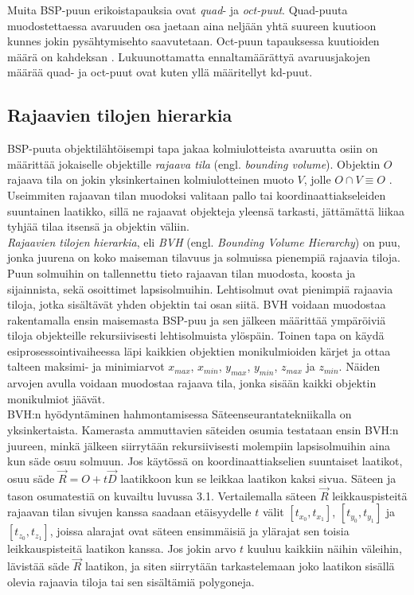 \documentclass[a4paper, 12pt, titlepage]{article}
\begin{document}
Muita BSP-puun erikoistapauksia ovat \emph{quad}- ja \emph{oct-puut}. Quad-puuta muodostettaessa avaruuden osa jaetaan aina neljään yhtä suureen kuutioon kunnes jokin pysähtymisehto saavutetaan. Oct-puun tapauksessa kuutioiden määrä on kahdeksan \citep[.]{samet}. Lukuunottamatta ennaltamäärättyä avaruusjakojen määrää quad- ja oct-puut ovat kuten yllä määritellyt kd-puut.

\subsection{Rajaavien tilojen hierarkia}

BSP-puuta objektilähtöisempi tapa jakaa kolmiulotteista avaruutta osiin on määrittää jokaiselle objektille \emph{rajaava tila} (engl. \emph{bounding volume}). Objektin $O$ rajaava tila on jokin yksinkertainen kolmiulotteinen muoto $V$, jolle $O \cap V \equiv O$ \citep{havran}. Useimmiten rajaavan tilan muodoksi valitaan pallo tai koordinaattiakseleiden suuntainen laatikko, sillä ne rajaavat objekteja yleensä tarkasti, jättämättä liikaa tyhjää tilaa itsensä ja objektin väliin. \citep{hughes} \\

\emph{Rajaavien tilojen hierarkia}, eli \emph{BVH} (engl. \emph{Bounding Volume Hierarchy}) on puu, jonka juurena on koko maiseman tilavuus ja solmuissa pienempiä rajaavia tiloja. Puun solmuihin on tallennettu tieto rajaavan tilan muodosta, koosta ja sijainnista, sekä osoittimet lapsisolmuihin. Lehtisolmut ovat pienimpiä rajaavia tiloja, jotka sisältävät yhden objektin tai osan siitä. BVH voidaan muodostaa rakentamalla ensin maisemasta BSP-puu ja sen jälkeen määrittää ympäröiviä tiloja objekteille rekursiivisesti lehtisolmuista ylöspäin. \citep{hughes} Toinen tapa on käydä esiprosessointivaiheessa läpi kaikkien objektien monikulmioiden kärjet ja ottaa talteen maksimi- ja minimiarvot $x_{max}$, $x_{min}$, $y_{max}$, $y_{min}$, $z_{max}$ ja $z_{min}$. Näiden arvojen avulla voidaan muodostaa rajaava tila, jonka sisään kaikki objektin monikulmiot jäävät. \citep[.]{janke}\\

BVH:n hyödyntäminen hahmontamisessa Säteenseurantatekniikalla on yksinkertaista. Kamerasta ammuttavien säteiden osumia testataan ensin BVH:n juureen, minkä jälkeen siirrytään rekursiivisesti molempiin lapsisolmuihin aina kun säde osuu solmuun. Jos käytössä on koordinaattiakselien suuntaiset laatikot, osuu säde $\vec{R}=O+t\vec{D}$ laatikkoon kun se leikkaa laatikon kaksi sivua. Säteen ja tason osumatestiä on kuvailtu luvussa 3.1. Vertailemalla säteen $\vec{R}$ leikkauspisteitä rajaavan tilan sivujen kanssa saadaan etäisyydelle $t$ välit $[t_{x_0}, t_{x_1}]$, $[t_{y_0}, t_{y_1}]$ ja $[t_{z_0}, t_{z_1}]$, joissa alarajat ovat säteen ensimmäisiä ja ylärajat sen toisia leikkauspisteitä laatikon kanssa. Jos jokin arvo $t$ kuuluu kaikkiin näihin väleihin, lävistää säde $\vec{R}$ laatikon, ja siten siirrytään tarkastelemaan joko laatikon sisällä olevia rajaavia tiloja tai sen sisältämiä polygoneja. \citep[.]{janke}\\
\end{document}
